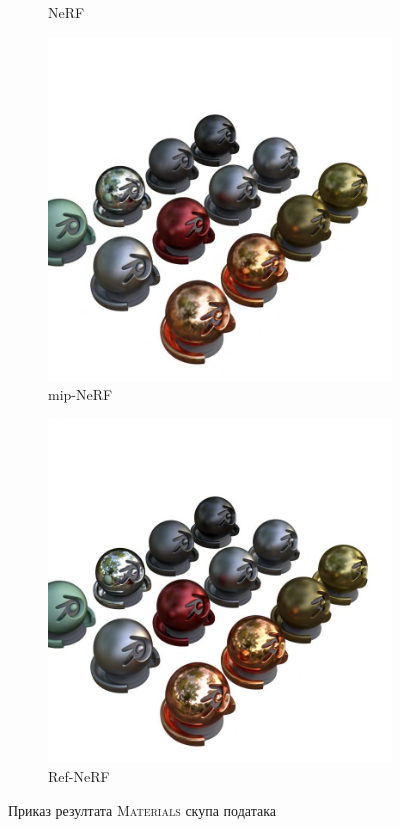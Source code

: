 \documentclass[12pt, a4paper, twoside]{book}
\numberwithin{equation}{chapter}
\numberwithin{theorem}{section}
\numberwithin{definition}{section}
\numberwithin{definitionChapter}{chapter}
\begin{document}
\begin{figure}[H]
\begin{subfigure}{0.475\textwidth}
			\caption{NeRF}
		\end{subfigure}
		\begin{subfigure}{0.475\textwidth}
			\centering
			\includegraphics[scale=0.25]{img/mipnerf/mipnerf_materials_36.jpg}
			\caption{mip-NeRF}
		\end{subfigure}
		\begin{subfigure}{0.475\textwidth}
			\centering
			\includegraphics[scale=0.25]{img/refnerf/refnerf_materials_36.jpg}
			\caption{Ref-NeRF}
		\end{subfigure}
		\caption{Приказ резултата \textsc{Materials} скупа података}
		\label{fig-materials-results}
	\end{figure}
\end{document}
